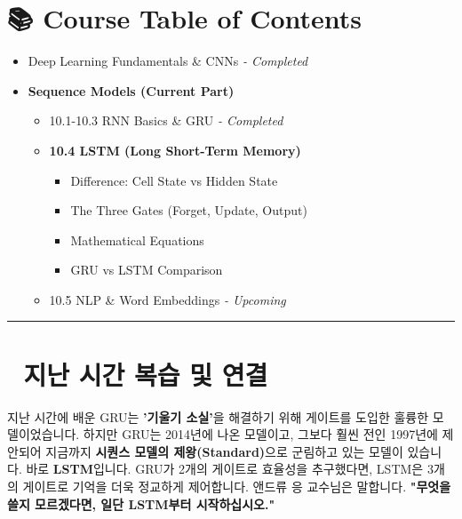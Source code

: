 \documentclass[11pt,a4paper]{book}
\theoremstyle{definition}
\begin{document}
\section*{📚 Course Table of Contents}
\begin{itemize}
    \item[Chapter 1-9.] Deep Learning Fundamentals \& CNNs \textit{- Completed}
    \item[\textbf{Chapter 10.}] \textbf{Sequence Models (Current Part)}
    \begin{itemize}
        \item 10.1-10.3 RNN Basics \& GRU \textit{- Completed}
        \item \textbf{10.4 LSTM (Long Short-Term Memory)}
        \begin{itemize}
            \item Difference: Cell State vs Hidden State
            \item The Three Gates (Forget, Update, Output)
            \item Mathematical Equations
            \item GRU vs LSTM Comparison
        \end{itemize}
        \item 10.5 NLP \& Word Embeddings \textit{- Upcoming}
    \end{itemize}
\end{itemize}

\vspace{0.5cm}
\hrule
\vspace{0.5cm}

\section*{🔗 지난 시간 복습 및 연결}
지난 시간에 배운 GRU는 \textbf{'기울기 소실'}을 해결하기 위해 게이트를 도입한 훌륭한 모델이었습니다.
하지만 GRU는 2014년에 나온 모델이고, 그보다 훨씬 전인 1997년에 제안되어 지금까지 \textbf{시퀀스 모델의 제왕(Standard)}으로 군림하고 있는 모델이 있습니다.
바로 \textbf{LSTM}입니다. GRU가 2개의 게이트로 효율성을 추구했다면, LSTM은 3개의 게이트로 기억을 더욱 정교하게 제어합니다. 앤드류 응 교수님은 말합니다.
\textbf{"무엇을 쓸지 모르겠다면, 일단 LSTM부터 시작하십시오."}

\end{document}
